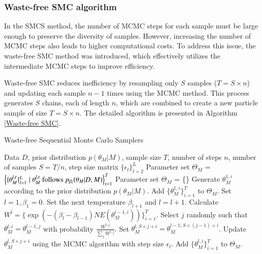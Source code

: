 \documentclass[12pt]{article}
\begin{document}
\subsubsection{Waste-free SMC algorithm}
In the SMCS method, the number of MCMC steps for each sample must be large enough to preserve the diversity of samples.
However, increasing the number of MCMC steps also leads to higher computational costs.
To address this issue, the waste-free SMC method \cite{dau2022waste} was introduced, which effectively utilizes the intermediate MCMC steps to improve efficiency.\par

Waste-free SMC reduces inefficiency by resampling only $S$ samples ($T = S\times n$) and updating each sample $n-1$ times using the MCMC method.
This process generates $S$ chains, each of length $n$, which are combined to create a new particle sample of size $T = S \times n$. The detailed algorithm is presented in Algorithm \ref{Waste-free SMC}. \par
\begin{algorithm}[h]
  \caption{Waste-free Sequential Monte Carlo Samplers}
  \label{Waste-free SMC}
  \begin{algorithmic}[1]
    \REQUIRE Data $D$, prior distribution $p(\theta_M|M)$, sample size $T$, number of steps $n$, number of samples $S = T/n$, step size matrix $\{\epsilon_l\}_{l = 2}^L$
    \ENSURE Parameter set $\Theta_M$ = $\left\{\{\theta_M^{l,t}\}_{l = 1}^L \mid \theta_M^{l,t} \textup{ follows } p_{\beta_l}(\theta_M|D,M)\right\}_{t = 1}^{T}$
    \STATE Parameter set $\Theta_M$ = \{\}
        \STATE Generate $\theta_M^{1,i}$ according to the prior distribution $p(\theta_M|M)$.
    \ENDFOR
    \STATE Add $\{\theta_M^{1,i}\}_{i=1}^T$ to $\Theta_M$.
    \STATE Set $l = 1, \beta_1 = 0$.
        \STATE Set the next temperature $\beta_{l+1}$ and $l = l + 1$.
        \STATE Calculate $W^l = \{ \exp(-(\beta_{l} - \beta_{l-1})NE(\theta_M^{l-1,i}))\}_{i=1}^T$.
            \STATE Select $j$ randomly such that $\theta_M^{l,i} = \theta_M^{l-1,j}$ with probability $\frac{W^{l,j}}{\sum_j W^{l,j}}$.
        \ENDFOR
                \STATE Set $\theta_M^{l,S\times j+i} = \theta_M^{l-1,S\times (j-1)+i}$. 
                \STATE Update $\theta_M^{l,S\times j+i}$ using the MCMC algorithm with step size $\epsilon_l$.
            \ENDFOR
        \ENDFOR
        \STATE Add $\{\theta_M^{l,i}\}_{i=1}^{T}$ to $\Theta_M$.
    \ENDWHILE
  \end{algorithmic}
\end{algorithm}
\end{document}
